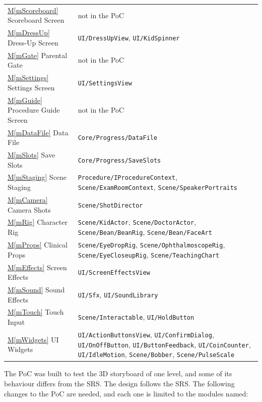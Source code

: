 \documentclass[12pt, titlepage]{article}
\newcommand{\mref}[1]{\hyperref[#1]{M\ref*{#1}}}
\begin{document}
\begin{longtable}{p{} p{}}
\mref{mScoreboard} Scoreboard Screen & not in the PoC\\
\mref{mDressUp} Dress-Up Screen & \texttt{UI/DressUpView}, \texttt{UI/KidSpinner}\\
\mref{mGate} Parental Gate & not in the PoC\\
\mref{mSettings} Settings Screen & \texttt{UI/SettingsView}\\
\mref{mGuide} Procedure Guide Screen & not in the PoC\\
\mref{mDataFile} Data File & \texttt{Core/Progress/DataFile}\\
\mref{mSlots} Save Slots & \texttt{Core/Progress/SaveSlots}\\
\mref{mStaging} Scene Staging & \texttt{Procedure/IProcedureContext}, \texttt{Scene/ExamRoomContext}, \texttt{Scene/SpeakerPortraits}\\
\mref{mCamera} Camera Shots & \texttt{Scene/ShotDirector}\\
\mref{mRig} Character Rig & \texttt{Scene/KidActor}, \texttt{Scene/DoctorActor}, \texttt{Scene/Bean/BeanRig}, \texttt{Scene/Bean/FaceArt}\\
\mref{mProps} Clinical Props & \texttt{Scene/EyeDropRig}, \texttt{Scene/OphthalmoscopeRig}, \texttt{Scene/EyeCloseupRig}, \texttt{Scene/TeachingChart}\\
\mref{mEffects} Screen Effects & \texttt{UI/ScreenEffectsView}\\
\mref{mSound} Sound Effects & \texttt{UI/Sfx}, \texttt{UI/SoundLibrary}\\
\mref{mTouch} Touch Input & \texttt{Scene/Interactable}, \texttt{UI/HoldButton}\\
\mref{mWidgets} UI Widgets & \texttt{UI/ActionButtonsView}, \texttt{UI/ConfirmDialog}, \texttt{UI/OnOffButton}, \texttt{UI/ButtonFeedback}, \texttt{UI/CoinCounter}, \texttt{UI/IdleMotion}, \texttt{Scene/Bobber}, \texttt{Scene/PulseScale}\\
\bottomrule
\end{longtable}

The PoC was built to test the 3D storyboard of one level, and some of its
behaviour differs from the SRS. The design follows the SRS. The following
changes to the PoC are needed, and each one is limited to the modules named:
\end{document}
